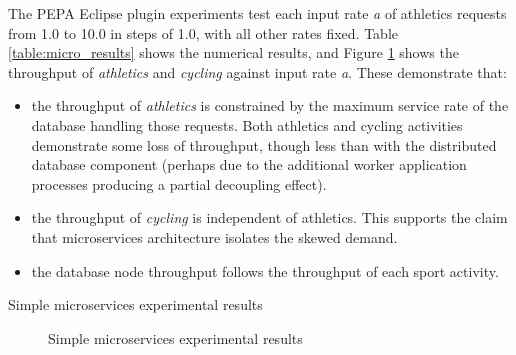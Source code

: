 \documentclass[runningheads]{llncs}
\begin{document}
The PEPA Eclipse plugin experiments test each input rate {\itshape a} of athletics requests from 1.0 to 10.0 in steps of 1.0, with all other rates fixed.  Table \ref{table:micro_results} shows the numerical results, and Figure \ref{figure:micro_charts} shows the throughput of {\itshape athletics} and {\itshape cycling} against input rate {\itshape a}.
These demonstrate that:
\begin{itemize}
	\item the throughput of {\itshape athletics} is constrained by the maximum service rate of the database handling those requests. Both athletics and cycling activities demonstrate some loss of throughput, though less than with the distributed database component (perhaps due to the additional worker application processes producing a partial decoupling effect).
	\item the throughput of {\itshape cycling} is independent of athletics.  This supports the claim that microservices architecture isolates the skewed demand.
	\item the database node throughput follows the throughput of each sport activity.
\end{itemize}

\begin{table}[h!]
	\centering
	\caption{Simple microservices experimental results}
	\label{table:micro_results}
\end{table}

\begin{figure}
	\centering
	\caption{Simple microservices experimental results}
	\label{figure:micro_charts}
\end{figure}
\end{document}
